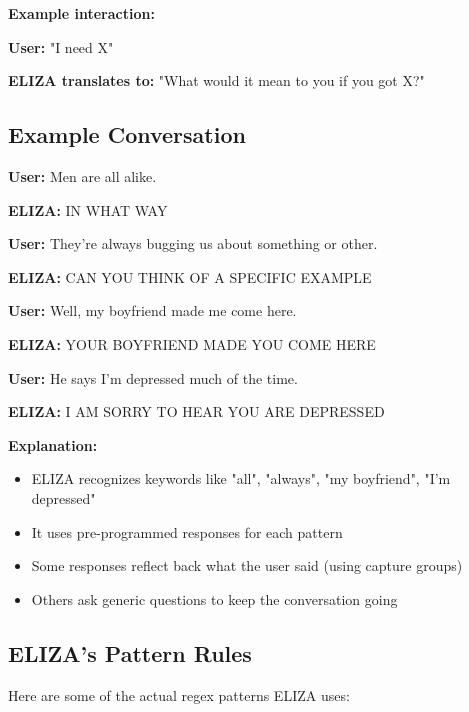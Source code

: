 \documentclass[11pt,a4paper]{article}
\theoremstyle{definition}
\theoremstyle{plain}
\theoremstyle{remark}
\begin{document}
\textbf{Example interaction:}

\textbf{User:} "I need X"

\textbf{ELIZA translates to:} "What would it mean to you if you got X?"

\subsection{Example Conversation}

\textbf{User:} Men are all alike.

\textbf{ELIZA:} IN WHAT WAY

\textbf{User:} They're always bugging us about something or other.

\textbf{ELIZA:} CAN YOU THINK OF A SPECIFIC EXAMPLE

\textbf{User:} Well, my boyfriend made me come here.

\textbf{ELIZA:} YOUR BOYFRIEND MADE YOU COME HERE

\textbf{User:} He says I'm depressed much of the time.

\textbf{ELIZA:} I AM SORRY TO HEAR YOU ARE DEPRESSED

\textbf{Explanation:}
\begin{itemize}
    \item ELIZA recognizes keywords like "all", "always", "my boyfriend", "I'm depressed"
    \item It uses pre-programmed responses for each pattern
    \item Some responses reflect back what the user said (using capture groups)
    \item Others ask generic questions to keep the conversation going
\end{itemize}

\subsection{ELIZA's Pattern Rules}

Here are some of the actual regex patterns ELIZA uses:
\end{document}
